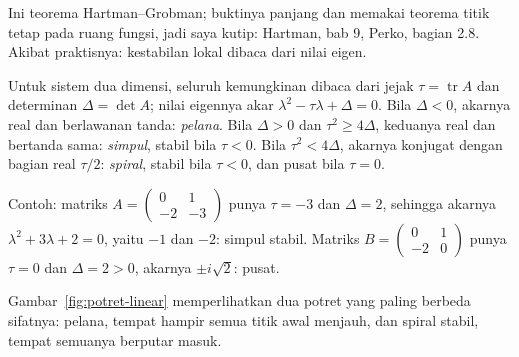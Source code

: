 Ini teorema Hartman--Grobman; buktinya panjang dan memakai teorema titik tetap
pada ruang fungsi, jadi saya kutip: Hartman, bab 9, Perko, bagian 2.8. Akibat
praktisnya: kestabilan lokal dibaca dari nilai eigen.

Untuk sistem dua dimensi, seluruh kemungkinan dibaca dari jejak
$\tau=\operatorname{tr}A$ dan determinan $\Delta=\det A$; nilai eigennya akar
$\lambda^{2}-\tau\lambda+\Delta=0$. Bila $\Delta<0$, akarnya real dan
berlawanan tanda: \emph{pelana}. Bila $\Delta>0$ dan $\tau^{2}\ge4\Delta$,
keduanya real dan bertanda sama: \emph{simpul}, stabil bila $\tau<0$. Bila
$\tau^{2}<4\Delta$, akarnya konjugat dengan bagian real $\tau/2$:
\emph{spiral}, stabil bila $\tau<0$, dan pusat bila $\tau=0$.

Contoh: matriks $A=\begin{pmatrix}0&1\\-2&-3\end{pmatrix}$ punya $\tau=-3$
dan $\Delta=2$, sehingga akarnya $\lambda^{2}+3\lambda+2=0$, yaitu $-1$ dan
$-2$: simpul stabil. Matriks $B=\begin{pmatrix}0&1\\-2&0\end{pmatrix}$ punya
$\tau=0$ dan $\Delta=2>0$, akarnya $\pm i\sqrt{2}$: pusat.

Gambar~\ref{fig:potret-linear} memperlihatkan dua potret yang paling berbeda
sifatnya: pelana, tempat hampir semua titik awal menjauh, dan spiral stabil,
tempat semuanya berputar masuk.

